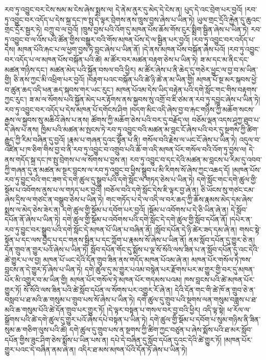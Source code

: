 རབ་ཏུ་འབྱུང་བར་ངེས་སམ་མ་ངེས་ཞེས་སྨྲས་ལ། དེ་ནེམ་ནུར་དུ་མེད་དེ་ངེས་ན། པུད་དེ་འང་བྲེག་པར་བྱའོ། །རབ་ཏུ་འབྱུང་བར་འདོད་པ་དེས་སྐྲ་དང་ཁ་སྤུ་དེ་ལྟར་བྲེགས་ནས་ཁྲུས་བྱས་ཞེས་པ་ཡིན་ཏེ། ཡུལ་གྲང་དྲོའི་རྐྱེན་དུ་ཆུའང་གྲང་དྲོར་སྦྱར་ཏེ། བཀྲུ་བ་ལ་བྱའོ། །ཁྲུས་བྱས་པའི་འོག་དུ་མཁན་པོས་ཆོས་གོས་ངུར་སྨྲིག་སྦྱིན་ཞེས་པ་ཡིན་ཏེ། རབ་ཏུ་འབྱུང་བ་ལ་འོས་པའི་ཚོན་གྱིས་བསྒྱུར་བའི་གོས་མཁན་པོས་དེ་ལ་སྦྱིན་པར་བྱའོ། །རབ་ཏུ་འབྱུང་བར་འདོད་པ་དེས། མཁན་པོའི་རྐང་པ་ལ་ཕྱག་བྱས་ཏེ་བླང་ཞེས་པ་ཡིན་ནོ། །དེ་ནས་མཁན་པོས་བསྐོན་ཞེས་པའོ། །རབ་ཏུ་འབྱུང་བར་འདོད་པ་ལ་མཁན་པོས་བསྐོན་པའི་ཚེ། མ་ཚོར་བར་མཚན་བརྟག་ཅེས་པ་ཡིན་ཏེ། ཟ་མ་དང་མ་ནིང་དང་མཚན་གཉིས་དང་། མཚན་མེད་པའི་སྐྱོན་བསལ་བའི་ཕྱིར། མ་ཚོར་ཞེས་པ་ནི་ཆེད་དུ་གཅེར་ཕྱུང་ལ་བྱ་བ་མ་ཡིན་གྱི། ཅི་ནས་ཀྱང་མི་འཕྲིག་པར་བྱའོ། །བརྟག་པའང་བསྐོན་པའི་ཚེ་ཉི་ཚེ་ན་མ་ཡིན་གྱི། མཁན་པོ་སྔ་མར་སྐབས་ཕྱེ་བ་ཚུན་ཆད་འདི་ཕན་ཆད་སྐབས་གར་ཡང་རུང་། མཁན་པོའམ་དེས་ཡིད་བརྟེན་པའི་དགེ་སློང་གང་གིས་བརྟགས་ཀྱང་རུང་། ཟ་མ་ལ་སོགས་པའི་སྐྱོན་མེད་པར་རྟོགས་ནས་སྐྱབས་སུ་འགྲོ་བ་ཇི་ཙམ་ན་རབ་ཏུ་དབྱུང་ཞེས་པ་ཡིན་ཏེ། རབ་ཏུ་འབྱུང་བར་འདོད་པ་དེས་མཁན་པོ་དགོངས་ཤིག །བདག་མིང་འདི་ཞེས་བྱ་བ་རྐང་གཉིས་ཀྱི་མཆོག་སངས་རྒྱས་ལ་སྐྱབས་སུ་མཆིའོ་ཞེས་པ་ནས། ཚོགས་ཀྱི་མཆོག་ཅེས་པའི་བར་དུ་བརྗོད་ལ། བཅོམ་ལྡན་འདས་ཤཱཀྱ་ཐུབ་པ་དེ་ཞེས་པ་ནས། ཁྱིམ་པའི་མཚན་མ་སྤངས་ཏེ་རབ་ཏུ་འབྱུང་བའི་མཚན་མ་བླང་ངོ་ཞེས་པའི་བར་དུ་སྔགས་ཀྱི་ཚིག་རྒྱུད་ཀྱི་རིམ་བཞིན་དུ་བྱའོ། །རྣམ་པ་གཞན་དུའང་སྟོན་པ་ནི། གསོལ་བའི་རྗེས་ལ་ཡང་ངོ་ཞེས་པ་ཡིན་ཏེ། འདུལ་བ་འཛིན་པ་ཁ་ཅིག་གིས་བྱ་བ་ནི་རབ་ཏུ་འབྱུང་བ་འགྲུབ་པའི་ཆོ་ག་འདི་མཁན་པོར་གསོལ་བའི་འོག་ཏུ་བྱས་ལ། དེ་ནས་གདོད་སྐྲ་དང་ཁ་སྤུ་བྲེགས་པ་ལ་སོགས་པ་བྱས་ན། རབ་ཏུ་འབྱུང་བ་དང་དེའི་མཚན་མ་བླངས་པ་རིམ་དུ་འབབ་ཀྱི་གཞན་དུ་ན་མཚན་མ་སྔར་བླངས་ལ་རབ་ཏུ་འབྱུང་བ་ཕྱིས་སྒྲུབ་པ་མི་རིགས་སོ་ཞེས་ཀྱང་འཆད་དོ། །མཁན་པོས་རབ་ཏུ་བྱུང་བའི་གང་ཟག་དེ་དགེ་ཚུལ་དུ་སྒྲུབ་པའི་དགེ་སློང་ལ་གཏད་ཅེས་པ་ཡིན་ཏེ། དགེ་སློང་གང་དགེ་ཚུལ་གྱི་སྡོམ་པ་འབོགས་ནུས་པ་ལ་གཏད་པར་བྱའོ། །བཅོལ་བའི་དགེ་སློང་དེས་ཇི་ལྟར་བྱ་ཞེ་ན། ཅི་ཡོངས་སུ་གཙང་ངམ་ཞེས་དྲིས་ལ་གཙང་ན་བསྒྲུབ་ཅེས་པ་ཡིན་ཏེ། གང་གཏོད་པ་དེ་ལ་འདི་ལ་བར་ཆད་ཀྱི་ཆོས་རྣམས་མེད་དམ་ཞེས་སྨྲས་ལ་མེད་ཅེས་ཟེར་ན། དགེ་ཚུལ་གྱི་སྡོམ་པ་དབོག་པར་བྱའོ། །སྡོམ་པ་འབོགས་པ་དེ་ཅི་ཡིན་ཞེ་ན། དེ་སློབ་དཔོན་ནོ་ཞེས་པ་ཡིན་ཏེ། དགེ་ཚུལ་གྱི་སྡོམ་པ་འབོགས་པའི་དགེ་སློང་དེ་དགེ་ཚུལ་གྱི་སློབ་དཔོན་ནོ། །དཔེར་ན་རབ་ཏུ་བྱུང་བར་སྒྲུབ་པའི་དགེ་སློང་དེ་མཁན་པོ་ཡིན་པ་བཞིན་ནོ། །སློབ་དཔོན་དེ་ཉི་ཚེར་ཟད་དམ་ཞེ་ན། གསང་སྟེ་སྟོན་པ་དང་ལས་བྱེད་པ་དང་གནས་སྦྱིན་པ་དང་ཀློག་པ་རྣམས་སོ་ཞེས་པ་ཡིན་ནོ། ནམ་སློབ་དཔོན་དུ་གྱུར་ཅེ་ན། དོན་གྲུབ་ན་གྱུར་པའོ་ཞེས་པ་ཡིན་ཏེ། སློབ་དཔོན་གོང་དུ་སྨོས་པ་ལྔ་སོ་སོའི་ལས་ཟིན་པ་ན་སློབ་དཔོན་དུ་འང་དེའི་ཚེ་གྱུར་པ་ལ་བྱ། མཁན་པོ་ཡང་དེའི་དོན་གྲུབ་ཟིན་ནས་གདོད་མཁན་པོའམ་ཞེ་ན། མཁན་པོར་གསོལ་ཏེ་ཁས་བླངས་ན་དེ་གྱུར་ཏོ་ཞེས་པ་ཡིན་ཏེ། དགེ་ཚུལ་དུ་མ་གྱུར་པའམ་བསྙེན་པར་རྫོགས་པར་མ་གྱུར་གྱི་བར་དུ་མཁན་པོར་མི་འགྱུར་བ་མ་ཡིན་གྱི། མཁན་པོར་གསོལ་ཏེ་མཁན་པོར་གདམས་པའམ། ཁས་བླངས་པའི་ཚེ་མཁན་པོར་གྱུར་ཏོ། སོ་སོའི་ལས་ཟིན་པའི་ཚེ་སློབ་དཔོན་ལ་སོགས་པར་འགྱུར་རོ་ཞེ་ན། དེའི་དོན་གང་གི་ཚེ་ཁོ་ན་གྲུབ་ཅེ་ན་བསླབ་པ་ཐ་མའི་ཆ་གསུམ་པ་གྲུབ་པས་སོ་ཞེས་པ་ཡིན་ཏེ། དགེ་ཚུལ་དུ་གྲུབ་པའི་སྔགས་ལན་གསུམ་བཟླས་པ་ཐ་མའི་ཆ་གསུམ་པོའི་ཚེ་དོན་གྲུབ་པར་གྱུར་ཏོ། །དེ་ལྟར་བསྟན་པ་གསལ་བར་བྱ་བའི་ཕྱིར། འདི་ལྟ་སྟེ། ཕ་རོལ་ལ་སྒྲོགས་པའི་ཚེ་དགེ་ཚུལ་དུ་གྱུར་པའོ་ཞེས་དཔེ་བསྟན་པ་ཡིན་ཏེ། དགེ་ཚུལ་གྱི་སྡོམ་པ་དབོག་པ་སུམ་གཉིས་ནི་ཟིན་སུམ་ཆ་གཅིག་ལུས་པའི་ཚེ། དགེ་ཚུལ་དུ་གྲུབ་པས་ན་སྔགས་ཀྱི་ཚིག་ཀྱང་བཙུན་པ་ཞེས་སྨོས་པའི་ཐ་མར་སློབ་དཔོན་གྱིས་ཟུང་ཤིག་ཅེས་སྨོས་པ་ཡིན་པས་ན། དཔེ་དེ་བཞིན་དུ་སློབ་དཔོན་དུའང་དེའི་ཚེ་གྱུར་ཏོ། །མཁན་པོར་གྱུར་པའང་དེ་བཞིན་ནམ་ཞེ་ན། འདིར་ཐ་མས་མཁན་པོའི་དོན་ཏོ་ཞེས་པ་ཡིན་ཏེ། 